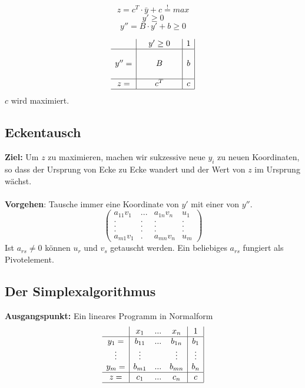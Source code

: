 \[z = c^T\cdot \bar{y} + c \stackrel{!}{=} max\]
\[y' \geq 0\]
\[y'' = B \cdot y' + b \geq 0\]

\[\begin{array}{c|ccc|c|}
	& & y' \geq 0 & & 1 \\
	\hline
	& & & & \\
	y''= & & B & & b \\
	& & & & \\
	\hline
	z= & & c^T & & c \\
	\hline
\end{array}\]
\(c\) wird maximiert.


\subsection{Eckentausch}
\textbf{Ziel:} Um \(z\) zu maximieren, machen wir sukzessive neue \(y_i\) zu neuen Koordinaten, so dass der Ursprung von Ecke zu Ecke wandert und der Wert von \(z\) im Ursprung wächst.
\\\\
\textbf{Vorgehen}: Tausche immer eine Koordinate von \(y'\) mit einer von \(y''\).
\[\begin{pmatrix}
	a_{11}v_1 & ... &a_{1n}v_n & u_1\\
	.   &		.	& .   & . \\
	.   &		.	& .   & . \\
	.   &		.	& .   & . \\
	a_{m1}v_1 & . & a_{mn}v_n & u_m
\end{pmatrix}\]
Ist \(a_{rs} \ne 0\) können \(u_r\) und \(v_s\) getauscht werden. Ein beliebiges \(a_{rs}\) fungiert als Pivotelement. 
\text{}\\



\subsection{Der Simplexalgorithmus}
\textbf{Ausgangspunkt:} Ein lineares Programm in Normalform
\[\begin{array}{c|ccc|c|}
	& x_1 & ... & x_n & 1 \\
	\hline
	y_1= & b_{11} & ... & b_{1n} & b_1 \\
	\vdots & \vdots & & \vdots & \vdots \\
	y_m= & b_{m1} & ... & b_{mn} & b_n \\
	\hline
	z= & c_1 & ... & c_n & c \\
	\hline
\end{array}\]
